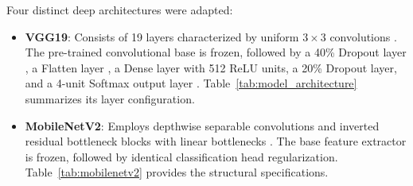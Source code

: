 \documentclass{ijcaArticle}
\begin{document}
Four distinct deep architectures were adapted:
\begin{itemize}
    \item \textbf{VGG19}: Consists of 19 layers characterized by uniform $3 \times 3$ convolutions \cite{p38,p39,p40}. The pre-trained convolutional base is frozen, followed by a 40\% Dropout layer \cite{p41,p42,p43}, a Flatten layer \cite{p44}, a Dense layer with 512 ReLU units, a 20\% Dropout layer, and a 4-unit Softmax output layer \cite{p45}. Table~\ref{tab:model_architecture} summarizes its layer configuration.

\begin{table}[htbp]
\label{tab:model_architecture}
\end{table}

    \item \textbf{MobileNetV2}: Employs depthwise separable convolutions and inverted residual bottleneck blocks with linear bottlenecks \cite{p37}. The base feature extractor is frozen, followed by identical classification head regularization. Table~\ref{tab:mobilenetv2} provides the structural specifications.


\end{itemize}
\end{document}
